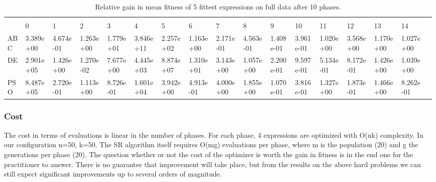 \begin{landscape}
\begin{table}[]
\centering
\caption{Relative gain in mean fitness of 5 fittest expressions on full data after 10 phases.}
\label{table:10phasemeanfull}
\begin{adjustbox}{width=1.7\textwidth}
\begin{tabular}{lllllllllllllllll}
     &           &           &           &           &           &           &           &           &           &           &           &           &           &           &           &  \\
     & 0         & 1         & 2         & 3         & 4         & 5         & 6         & 7         & 8         & 9         & 10        & 11        & 12        & 13        & 14        &  \\
ABC                 & 3.389e+00 & 4.674e-01 & 1.263e+00 & 1.779e+01 & 3.846e+11 & 2.257e+02 & 1.163e+00 & 2.171e-01 & 4.563e-01 & 1.408e-01 & 3.961e-01 & 1.020e+00 & 3.568e+00 & 1.170e+00 & 1.027e+00 &  \\
DE                  & 2.901e+05 & 1.426e+00 & 1.270e-02 & 7.677e+00 & 4.445e+03 & 8.874e+07 & 1.310e+01 & 3.143e+00 & 1.057e+00 & 2.200e-01 & 9.597e-01 & 5.134e-01 & 8.172e-01 & 1.426e+00 & 1.039e+00 &  \\
PSO                 & 8.487e+05 & 2.720e-01 & 1.113e+00 & 8.726e-01 & 1.601e+04 & 3.942e+00 & 4.913e-01 & 4.000e+00 & 1.855e+00 & 1.070e-01 & 3.816e-01 & 1.327e+00 & 1.873e-01 & 1.466e+00 & 8.262e-01 & 
\end{tabular}
\end{adjustbox}
\end{table}
\end{landscape}

\subsubsection{Cost}
The cost in terms of evaluations is linear in the number of phases. For each phase, 4 expressions are optimized with O(nk) complexity. In our configuration n=50, k=50. The SR algorithm itself requires O(mg) evaluations per phase, where m is the population (20) and g the generations per phase (20). The question whether or not the cost of the optimizer is worth the gain in fitness is in the end one for the practitioner to answer. There is no guarantee that improvement will take place, but from the results on the above hard problems we can still expect significant improvements up to several orders of magnitude.

